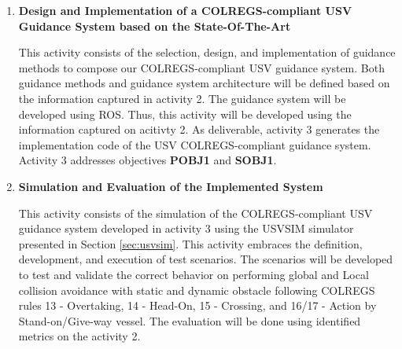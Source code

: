\begin{enumerate}
            
            \item \textbf{Design and Implementation of a \ac{COLREGS}-compliant \ac{USV} Guidance System based on the State-Of-The-Art}
            
            This activity consists of the selection, design, and implementation of guidance methods to compose our \ac{COLREGS}-compliant \ac{USV} guidance system. Both guidance methods and guidance system architecture will be defined based on the information captured in activity 2. The guidance system will be developed using \ac{ROS}. Thus, this activity will be developed using the information captured on acitivty 2. As deliverable, activity 3 generates the implementation code of the \ac{USV} \ac{COLREGS}-compliant guidance system. Activity 3 addresses objectives \textbf{POBJ1} and \textbf{SOBJ1}.
            
            \item \textbf{Simulation and Evaluation of the Implemented System} 
            
            This activity consists of the simulation of the \ac{COLREGS}-compliant \ac{USV} guidance system developed in activity 3 using the USVSIM simulator presented in Section \ref{sec:usvsim}. This activity embraces the definition, development, and execution of test scenarios. The scenarios will be developed to test and validate the correct behavior on performing global and Local collision avoidance with static and dynamic obstacle following \ac{COLREGS} rules 13 - Overtaking, 14 - Head-On, 15 - Crossing, and 16/17 - Action by Stand-on/Give-way vessel. The evaluation will be done using identified metrics on the activity 2.
            
            
            

\end{enumerate}
